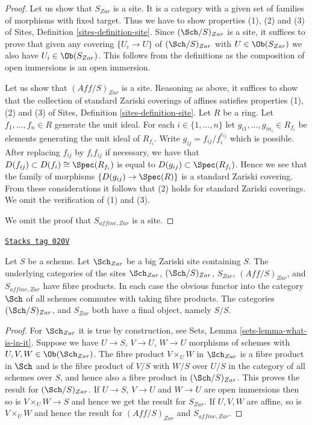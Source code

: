 \begin{proof}
Let us show that $S_{Zar}$ is a site. It is a category with a
given set of families of morphisms with fixed target. Thus we
have to show properties (1), (2) and (3) of
Sites, Definition \ref{sites-definition-site}.
Since $(\Sch/S)_{Zar}$ is a site, it suffices to prove
that given any covering $\{U_i \to U\}$ of $(\Sch/S)_{Zar}$
with $U \in \Ob(S_{Zar})$ we also have $U_i \in \Ob(S_{Zar})$.
This follows from the definitions
as the composition of open immersions is an open immersion.

\medskip\noindent
Let us show that $(\textit{Aff}/S)_{Zar}$ is a site.
Reasoning as above, it suffices to show that the collection
of standard Zariski coverings of affines satisfies properties
(1), (2) and (3) of
Sites, Definition \ref{sites-definition-site}.
Let $R$ be a ring. Let $f_1, \ldots, f_n \in R$ generate the unit ideal.
For each $i \in \{1, \ldots, n\}$ let $g_{i1}, \ldots, g_{in_i} \in R_{f_i}$
be elements generating the unit ideal of $R_{f_i}$. Write
$g_{ij} = f_{ij}/f_i^{e_{ij}}$ which is possible. After replacing
$f_{ij}$ by $f_i f_{ij}$ if necessary, we have that
$D(f_{ij}) \subset D(f_i) \cong \Spec(R_{f_i})$ is
equal to $D(g_{ij}) \subset \Spec(R_{f_i})$. Hence we see that
the family of morphisms $\{D(g_{ij}) \to \Spec(R)\}$
is a standard Zariski covering. From these considerations
it follows that (2) holds for standard Zariski coverings.
We omit the verification of (1) and (3).

\medskip\noindent
We omit the proof that $S_{affine, Zar}$ is a site.
\end{proof}

\begin{lemma}
\label{topologies-lemma-fibre-products-Zariski}
\href{https://stacks.math.columbia.edu/tag/020V}{\texttt{Stacks tag 020V}}

Let $S$ be a scheme. Let $\Sch_{Zar}$ be a big Zariski
site containing $S$. The underlying categories of the sites
$\Sch_{Zar}$, $(\Sch/S)_{Zar}$,
$S_{Zar}$, $(\textit{Aff}/S)_{Zar}$, and $S_{affine, Zar}$ have fibre products.
In each case the obvious functor into the category $\Sch$ of
all schemes commutes with taking fibre products. The categories
$(\Sch/S)_{Zar}$, and $S_{Zar}$ both have a final object,
namely $S/S$.
\end{lemma}

\begin{proof}
For $\Sch_{Zar}$ it is true by construction, see
Sets, Lemma \ref{sets-lemma-what-is-in-it}.
Suppose we have $U \to S$, $V \to U$, $W \to U$ morphisms
of schemes with $U, V, W \in \Ob(\Sch_{Zar})$.
The fibre product $V \times_U W$ in $\Sch_{Zar}$
is a fibre product in $\Sch$ and
is the fibre product of $V/S$ with $W/S$ over $U/S$ in
the category of all schemes over $S$, and hence also a
fibre product in $(\Sch/S)_{Zar}$.
This proves the result for $(\Sch/S)_{Zar}$.
If $U \to S$, $V \to U$ and $W \to U$ are open immersions then so is
$V \times_U W \to S$ and hence we get the result for $S_{Zar}$.
If $U, V, W$ are affine, so is $V \times_U W$ and hence the
result for $(\textit{Aff}/S)_{Zar}$ and $S_{affine, Zar}$.
\end{proof}


